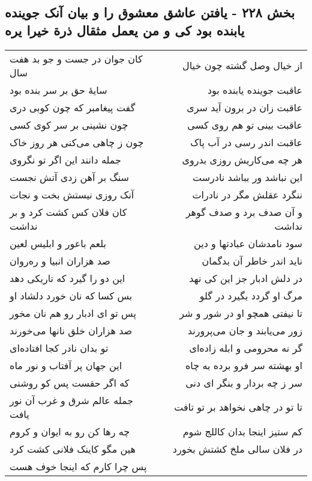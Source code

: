 \begin{center}
\section*{بخش ۲۲۸ - یافتن عاشق معشوق را و بیان آنک جوینده یابنده بود کی و من یعمل مثقال ذرة خیرا یره}
\label{sec:sh228}
\begin{longtable}{l p{0.5cm} r}
کان جوان در جست و جو بد هفت سال
&&
از خیال وصل گشته چون خیال
\\
سایهٔ حق بر سر بنده بود
&&
عاقبت جوینده یابنده بود
\\
گفت پیغامبر که چون کوبی دری
&&
عاقبت زان در برون آید سری
\\
چون نشینی بر سر کوی کسی
&&
عاقبت بینی تو هم روی کسی
\\
چون ز چاهی می‌کنی هر روز خاک
&&
عاقبت اندر رسی در آب پاک
\\
جمله دانند این اگر تو نگروی
&&
هر چه می‌کاریش روزی بدروی
\\
سنگ بر آهن زدی آتش نجست
&&
این نباشد ور بباشد نادرست
\\
آنک روزی نیستش بخت و نجات
&&
ننگرد عقلش مگر در نادرات
\\
کان فلان کس کشت کرد و بر نداشت
&&
و آن صدف برد و صدف گوهر نداشت
\\
بلعم باعور و ابلیس لعین
&&
سود نامدشان عبادتها و دین
\\
صد هزاران انبیا و ره‌روان
&&
ناید اندر خاطر آن بدگمان
\\
این دو را گیرد که تاریکی دهد
&&
در دلش ادبار جز این کی نهد
\\
بس کسا که نان خورد دلشاد او
&&
مرگ او گردد بگیرد در گلو
\\
پس تو ای ادبار رو هم نان مخور
&&
تا نیفتی همچو او در شور و شر
\\
صد هزاران خلق نانها می‌خورند
&&
زور می‌یابند و جان می‌پرورند
\\
تو بدان نادر کجا افتاده‌ای
&&
گر نه محرومی و ابله زاده‌ای
\\
این جهان پر آفتاب و نور ماه
&&
او بهشته سر فرو برده به چاه
\\
که اگر حقست پس کو روشنی
&&
سر ز چه بردار و بنگر ای دنی
\\
جمله عالم شرق و غرب آن نور یافت
&&
تا تو در چاهی نخواهد بر تو تافت
\\
چه رها کن رو به ایوان و کروم
&&
کم ستیز اینجا بدان کاللج شوم
\\
هین مگو کاینک فلانی کشت کرد
&&
در فلان سالی ملخ کشتش بخورد
\\
پس چرا کارم که اینجا خوف هست

\end{longtable}
\end{center}
